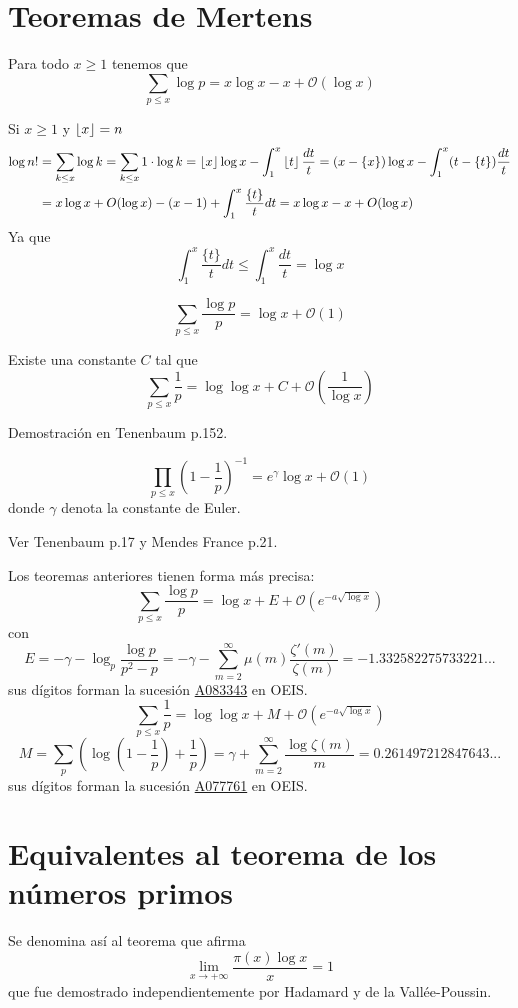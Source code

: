 \documentclass[TAN.tex]{subfiles}
\begin{document}
\section{Teoremas de Mertens}
\begin{teorema} Para todo $x\geq 1$ tenemos que
\[ \sum_{p≤x} {\log p} = x\log x -x+ \mathcal{O}(\log x) \]
\end{teorema}

\begin{dem}
Si $x\geq 1$ y $\left\lfloor{ x }\right\rfloor = n$
\begin{align*}
\log n! &= \sum_{k\leq x} \log k = \sum_{k \leq x} 1 \cdot \log k = \left\lfloor{ x }\right\rfloor\log x - \int_1^x \left\lfloor{ t }\right\rfloor \frac{dt}{t} = (x-\left\{{x}\right\})\log x - \int_1^x (t-\left\{{t}\right\})\frac{dt}{t}\\
& =
x\log x + O(\log x) - (x-1) + \int_1^x\frac{\{t\}}{t}dt =  x\log x - x  + O(\log x)
\end{align*}
Ya que 
$$
 \int_1^x\frac{\{t\}}{t}dt  \leq  \int_1^x\frac{dt}{t} = \log x 
$$
\end{dem}
\begin{teorema}
\[ \sum_{p≤x} \frac{\log p}{p} = \log x + \mathcal{O}(1) \]
\end{teorema}
\begin{teorema}[Mertens]
Existe una constante $C$ tal que
\[ \sum_{p≤x} \frac{1}{p} = \log \log x + C + \mathcal{O}\left(\frac{1}{\log x}\right) \]
\end{teorema}
Demostración en Tenenbaum p.152.

\begin{teorema}
\[ \prod_{p≤x} \left(1-\frac{1}{p}\right)^{-1} = e^γ\log x + \mathcal{O}(1) \]
donde $γ$ denota la constante de Euler.
\end{teorema}
Ver Tenenbaum p.17 y Mendes France p.21.

Los teoremas anteriores tienen forma más precisa:
\[ \sum_{p≤x} \frac{\log p}{p} = \log x + E + \mathcal{O}(e^{-a\sqrt{\log x}}) \]
con
\[ E = -γ-\log_{p} \frac{\log p}{p^2-p} = -γ-\sum_{m=2}^{∞} μ(m) \frac{ζ'(m)}{ζ(m)} = -1.332582275733221... \]
sus dígitos forman la sucesión \href{https://oeis.org/A083343}{A083343} en OEIS.
\[ \sum_{p≤x} \frac{1}{p} = \log \log x + M + \mathcal{O}(e^{-a\sqrt{\log x}}) \]
\[ M = \sum_{p} \left(\log \left(1-\frac{1}{p}\right)+\frac{1}{p}\right) = γ + \sum_{m=2}^{∞} \frac{\log ζ(m)}{m} = 0.261497212847643... \]
sus dígitos forman la sucesión \href{https://oeis.org/A077761}{A077761} en OEIS. 

\section{Equivalentes al teorema de los números primos}
Se denomina así al teorema que afirma
\[ \lim_{x\to+∞} \frac{π(x)\log x}{x} = 1 \]
que fue demostrado independientemente por Hadamard y de la Vallée-Poussin.
\end{document}

